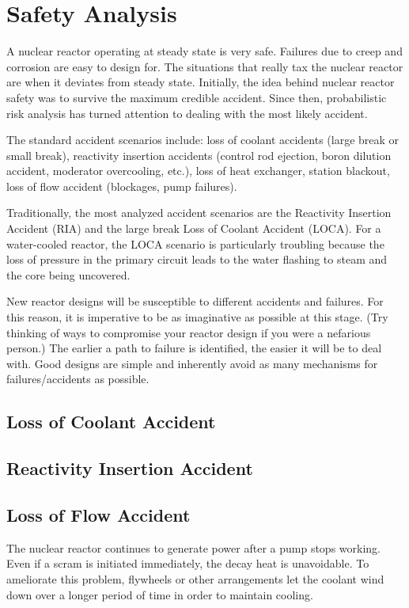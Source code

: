 
\section{Safety Analysis}
A nuclear reactor operating at steady state is very safe. Failures due to creep and corrosion are easy to design for.
The situations that really tax the nuclear reactor are when it deviates from steady state.
Initially, the idea behind nuclear reactor safety was to survive the maximum credible accident.
Since then, probabilistic risk analysis has turned attention to dealing with the most likely accident. 

The standard accident scenarios include: loss of coolant accidents (large break or small break), reactivity insertion accidents (control rod ejection, boron dilution accident, moderator overcooling, etc.), loss of heat exchanger, station blackout, loss of flow accident (blockages, pump failures).

Traditionally, the most analyzed accident scenarios are the Reactivity Insertion Accident (RIA) and the large break Loss of Coolant Accident (LOCA). 
For a water-cooled reactor, the LOCA scenario is particularly troubling because the loss of pressure in the primary circuit leads to the water flashing to steam and the core being uncovered.

New reactor designs will be susceptible to different accidents and failures. For this reason, it is imperative to be as imaginative as possible at this stage.
(Try thinking of ways to compromise your reactor design if you were a nefarious person.)
The earlier a path to failure is identified, the easier it will be to deal with.
Good designs are simple and inherently avoid as many mechanisms for failures/accidents as possible.

\subsection{Loss of Coolant Accident}

\subsection{Reactivity Insertion Accident}

\subsection{Loss of Flow Accident}
The nuclear reactor continues to generate power after a pump stops working. Even if a scram is initiated immediately, the decay heat is unavoidable.
To ameliorate this problem, flywheels or other arrangements let the coolant wind down over a longer period of time in order to maintain cooling.

